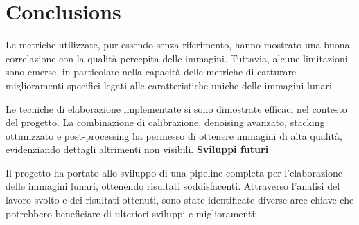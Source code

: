 \chapter*{Conclusions}


Le metriche utilizzate, pur essendo senza riferimento, hanno mostrato una buona correlazione con la qualità percepita delle immagini. Tuttavia, alcune limitazioni sono emerse, in particolare nella capacità delle metriche di catturare miglioramenti specifici legati alle caratteristiche uniche delle immagini lunari.

Le tecniche di elaborazione implementate si sono dimostrate efficaci nel contesto del progetto. La combinazione di calibrazione, denoising avanzato, stacking ottimizzato e post-processing ha permesso di ottenere immagini di alta qualità, evidenziando dettagli altrimenti non visibili.
\textbf{Sviluppi futuri}

Il progetto ha portato allo sviluppo di una pipeline completa per l'elaborazione delle immagini lunari, ottenendo risultati soddisfacenti. Attraverso l'analisi del lavoro svolto e dei risultati ottenuti, sono state identificate diverse aree chiave che potrebbero beneficiare di ulteriori sviluppi e miglioramenti:

